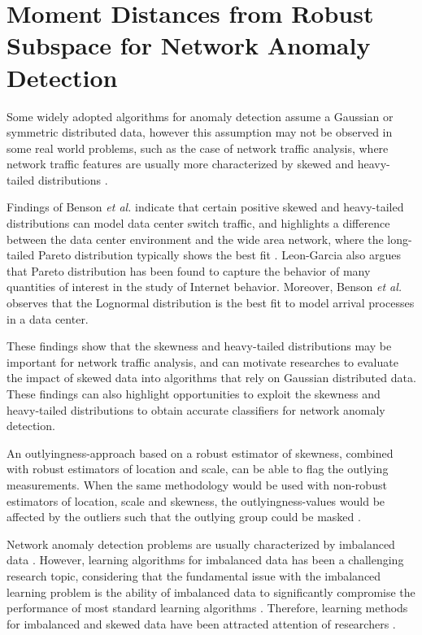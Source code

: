 \chapter{Moment Distances from Robust Subspace for Network Anomaly Detection}
\label{ch:4_m_rpca}

Some widely adopted algorithms for anomaly detection assume a Gaussian or symmetric distributed data, however this assumption may not be observed in some real world problems, such as the case of network traffic analysis, where network traffic features are usually more characterized by skewed and heavy-tailed distributions \cite{lakhina2005mining,benson2010network, leon2017probability}.

Findings of Benson \emph{et al.}  \cite{benson2010network} indicate that certain positive skewed and heavy-tailed distributions can model data center switch traffic, and highlights a difference between the data center environment and the wide area network, where the long-tailed Pareto distribution typically shows the best fit \cite{benson2010network}. Leon-Garcia \cite{leon2017probability} also argues that Pareto distribution has been found to capture the behavior of many quantities of interest in the study of Internet behavior. Moreover, Benson \emph{et al.}  \cite{benson2010network} observes that the Lognormal distribution is the best fit to model arrival processes in a data center.

These findings show that the skewness and heavy-tailed distributions may be important for network traffic analysis, and can motivate researches to evaluate the impact of skewed data into algorithms that rely on Gaussian distributed data. These findings can also highlight opportunities to  exploit the skewness and heavy-tailed distributions to obtain accurate classifiers for network anomaly detection.

An outlyingness-approach based on a robust estimator of skewness, combined with robust estimators of location and scale, can be able to flag the outlying measurements. When the same methodology would be used with non-robust estimators of location, scale and skewness, the outlyingness-values would be affected by the outliers such that the outlying group could be masked \cite{hubert2009robustskewed}.

Network anomaly detection problems are usually characterized by imbalanced data \cite{Phua2004minority,he2008learning,benson2010network}. However, learning algorithms for imbalanced data has been a challenging research topic, considering that the fundamental issue with the imbalanced learning problem is the ability of imbalanced data to significantly compromise the performance of most standard learning algorithms \cite{he2008learning}. Therefore, learning methods for imbalanced and skewed data have been attracted attention of researchers \cite{Phua2004minority,hubert2009robustskewed}.

